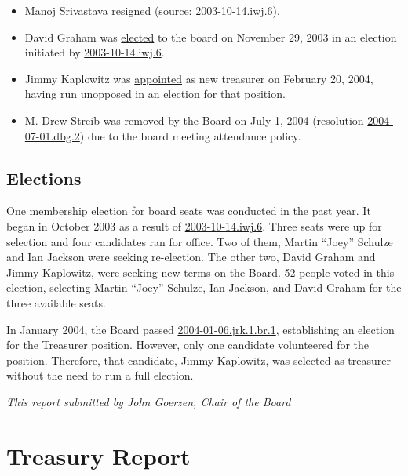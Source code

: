 \documentclass[letterpaper]{report}
\begin{document}
\begin{itemize}
\item Manoj Srivastava resigned (source: \href{https://www.spi-inc.org/corporate/resolutions/2003/2003-10-14.iwj.6}{2003-10-14.iwj.6}).
\item David Graham was \href{http://lists.spi-inc.org/pipermail/spi-announce/2003/000065.html}{elected}
to the board on November 29, 2003 in an election initiated by \href{https://www.spi-inc.org/corporate/resolutions/2003/2003-10-14.iwj.6}{2003-10-14.iwj.6}.
\item Jimmy Kaplowitz was \href{http://lists.spi-inc.org/pipermail/spi-announce/2004/000070.html}{appointed}
as new treasurer on February 20, 2004, having run unopposed in an
election for that position.
\item M. Drew Streib was removed by the Board on July 1, 2004 (resolution
\href{http://lists.spi-inc.org/pipermail/spi-announce/2004/000083.html}{2004-07-01.dbg.2})
due to the board meeting attendance policy.
\end{itemize}

\section{Elections}

One membership election for board seats was conducted in the past
year. It began in October 2003 as a result of \href{http://lists.spi-inc.org/pipermail/spi-announce/2003/000057.html}{2003-10-14.iwj.6}.
Three seats were up for selection and four candidates ran for office.
Two of them, Martin ``Joey'' Schulze and Ian Jackson were seeking
re-election. The other two, David Graham and Jimmy Kaplowitz, were
seeking new terms on the Board. 52 people voted in this election,
selecting Martin ``Joey'' Schulze, Ian Jackson, and David Graham
for the three available seats.

In January 2004, the Board passed \href{http://lists.spi-inc.org/pipermail/spi-announce/2004/000069.html}{2004-01-06.jrk.1.br.1},
establishing an election for the Treasurer position. However, only
one candidate volunteered for the position. Therefore, that candidate,
Jimmy Kaplowitz, was selected as treasurer without the need to run
a full election.

\emph{This report submitted by John Goerzen, Chair of the Board}


\chapter{Treasury Report}
\end{document}
